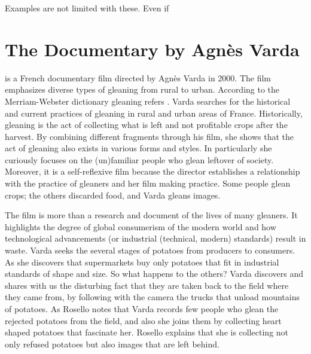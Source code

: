 Examples are not limited with these. Even if 



%
\section{The Documentary  by Agnès Varda}
 is a French documentary film directed by Agnès Varda in 2000. The film emphasizes diverse types of gleaning from rural to urban. According to the Merriam-Webster dictionary gleaning refers . Varda searches for the historical and current practices of gleaning in rural and urban areas of France. Historically, gleaning is the act of collecting what is left and not profitable crops after the harvest. By combining different fragments through his film, she shows that the act of gleaning also exists in various forms and styles. In particularly she curiously focuses on the (un)familiar people who glean leftover of society. Moreover, it is a self-reflexive film because the director establishes a relationship with the practice of gleaners and her film making practice. Some people glean crops; the others discarded food, and Varda gleans images.

The film is more than a research and document of the lives of many gleaners. It highlights the degree of global consumerism of the modern world and how technological advancements (or industrial (technical, modern) standards) result in waste. Varda seeks the several stages of potatoes from producers to consumers. As she discovers that supermarkets buy only potatoes that fit in industrial standards of shape and size. So what happens to the others? Varda discovers and shares with us the disturbing fact that they are taken back to the field where they came from, by following with the camera the trucks that unload mountains of potatoes. As Rosello notes that  Varda records few people who glean the rejected potatoes from the field, and also she joins them by collecting heart shaped potatoes that fascinate her. Rosello explains that she is collecting not only refused potatoes but also images that are left behind.

